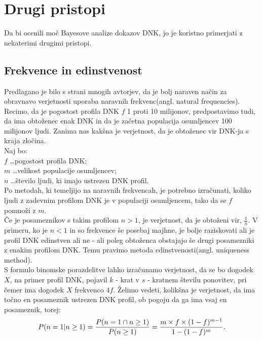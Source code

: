 \documentclass[12pt,a4paper]{amsart}
\theoremstyle{definition} %
\theoremstyle{plain} %
\begin{document}
\section{Drugi pristopi}
Da bi ocenili moč Bayesove analize dokazov DNK, jo je koristno primerjati z nekaterimi drugimi pristopi. \\

\subsection{Frekvence in edinstvenost}
Predlagano je bilo s strani mnogih avtorjev, da je bolj naraven način za obravnavo verjetnosti uporaba naravnih frekvenc(angl. natural 
frequencies). Recimo, da je pogostost profila DNK $f$ 1 proti 10 milijonov, predpostavimo tudi, da ima obtoženec enak DNK in da je začetna 
populacija osumljencev 100 milijonov ljudi. Zanima nas kakšna je verjetnost, da je obtoženec vir DNK-ja s kraja zločina. \\

Naj bo: \\
$f$ \dots pogostost profila DNK;\\
$m$ \dots velikost populacije osumljencev; \\
$n$ \dots število ljudi, ki imajo ustrezen DNK profil. \\
Po metodah, ki temeljijo na naravnih frekvencah, je potrebno izračunati, koliko ljudi z zadevnim profilom DNK je v populaciji osumljencem, tako 
da se $f$ pomnoži z $m$.  \\
Če je posameznikov s takim profilom $n > 1$, je verjetnost, da je obtoženi vir, $\frac{1}{n}$. V primeru, ko je $n < 1$ in so frekvence še 
posebaj majhne, je bolje raziskovati ali je profil DNK edinstven ali ne - ali poleg obtoženca obstajajo še drugi posamezniki z enakim 
profilom DNK. Temu pravimo metoda edinstvenosti(angl. uniqueness method). \\

S formulo binomske porazdelitve lahko izračunamo verjetnost, da se bo dogodek $X$, na primer profil DNK, pojavil $k$ - krat v $s$ - kratnem 
številu ponovitev, pri čemer ima dogodek $X$ frekvenco 4$f$. Želimo vedeti, kolikšna je verjetnost, da ima točno en posameznik ustrezen DNK 
profil, ob pogoju da ga ima vsaj en posameznik, torej: \vspace{3mm}
\[P(n = 1 \lvert n \ge 1) = \frac{P(n=1 \cap n \ge 1)}{P(n \ge 1)} = \frac{m \times f \times (1 - f)^{m-1}}{1 - (1-f)^m}. \vspace{3mm}\]
\end{document}
